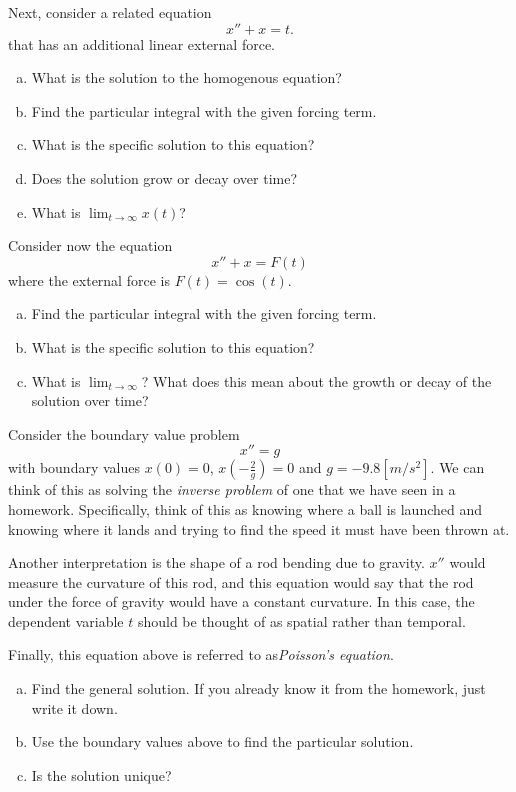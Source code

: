 \documentclass[12pt]{article} %
\begin{document}
\begin{problem}
Next, consider a related equation
\[
x''+x=t.
\]
that has an additional linear external force.
\begin{enumerate}[(a)]
    \item What is the solution to the homogenous equation?
    \item Find the particular integral with the given forcing term.
    \item What is the specific solution to this equation?
    \item Does the solution grow or decay over time?
    \item What is $\lim_{t\to \infty}x(t)$?
\end{enumerate}
\end{problem}

\begin{problem}
Consider now the equation
\[
x''+x=F(t)
\]
where the external force is $F(t)=\cos(t)$.
\begin{enumerate}[(a)]
    \item Find the particular integral with the given forcing term.
    \item What is the specific solution to this equation?
    \item What is $\lim_{t\to \infty}$? What does this mean about the growth or decay of the solution over time?
\end{enumerate}
\end{problem}

\begin{problem}
Consider the boundary value problem
\[
x''=g
\]
with boundary values $x(0)=0$, $x\left(-\frac{2}{g}\right)=0$ and $g=-9.8[m/s^2]$.  We can think of this as solving the \emph{inverse problem} of one that we have seen in a homework. Specifically, think of this as knowing where a ball is launched and knowing where it lands and trying to find the speed it must have been thrown at.  

Another interpretation is the shape of a rod bending due to gravity.  $x''$ would measure the curvature of this rod, and this equation would say that the rod under the force of gravity would have a constant curvature. In this case, the dependent variable $t$ should be thought of as spatial rather than temporal.

Finally, this equation above is referred to as\emph{Poisson's equation}.
\begin{enumerate}[(a)]
    \item Find the general solution. If you already know it from the homework, just write it down.
    \item Use the boundary values above to find the particular solution.
    \item Is the solution unique? 
\end{enumerate}
\end{problem}
\end{document}
